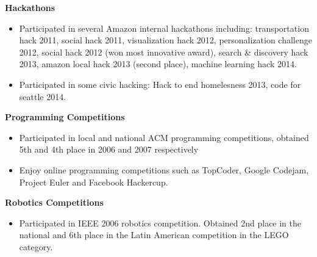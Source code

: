 \documentclass[10pt]{article}
\newcommand{\vitem}{\vspace*{-.4pc}\item}
\begin{document}
\flushleft{}\textbf{Hackathons}
\begin{itemize}
\vitem Participated in several Amazon internal hackathons including:
transportation hack 2011, social hack 2011, visualization hack 2012,
personalization challenge 2012, social hack 2012 (won most innovative
award), search \& discovery hack 2013, amazon local hack 2013 (second
place), machine learning hack 2014.
\vitem Participated in some civic hacking: Hack to end homelesness 2013,
code for seattle 2014.
\end{itemize}

\flushleft{}\textbf{Programming Competitions}
\begin{itemize}
\vitem Participated in local and national ACM programming competitions, obtained 5th and 4th place in 2006 and 2007 respectively
\vitem Enjoy online programming competitions such as TopCoder, Google
Codejam, Project Euler and Facebook Hackercup.
\end{itemize}

\textbf{Robotics Competitions}
\begin{itemize}
\vitem Participated in IEEE 2006 robotics competition. Obtained 2nd place in the national and 6th place in the Latin American competition in the LEGO category.
\end{itemize}
\end{document}
